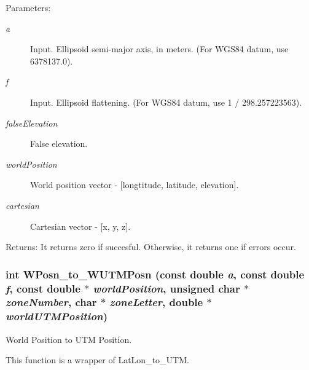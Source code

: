 \begin{Desc}
\item[Parameters:]
\begin{description}
\item[{\em a}]Input. Ellipsoid semi-major axis, in meters. (For WGS84 datum, use 6378137.0). \item[{\em f}]Input. Ellipsoid flattening. (For WGS84 datum, use 1 / 298.257223563). \item[{\em falseElevation}]False elevation. \item[{\em worldPosition}]World position vector - \mbox{[}longtitude, latitude, elevation\mbox{]}. \item[{\em cartesian}]Cartesian vector - \mbox{[}x, y, z\mbox{]}.\end{description}
\end{Desc}
\begin{Desc}
\item[Returns:]It returns zero if succesful. Otherwise, it returns one if errors occur. \end{Desc}
\hypertarget{group__Coordinate_g243a9a9ac70866ba4d4513d353058e92}{
\subsubsection[WPosn\_\-to\_\-WUTMPosn]{\setlength{\rightskip}{0pt plus 5cm}int WPosn\_\-to\_\-WUTMPosn (const double {\em a}, \/  const double {\em f}, \/  const double $\ast$ {\em worldPosition}, \/  unsigned char $\ast$ {\em zoneNumber}, \/  char $\ast$ {\em zoneLetter}, \/  double $\ast$ {\em worldUTMPosition})}}
\label{group__Coordinate_g243a9a9ac70866ba4d4513d353058e92}


World Position to UTM Position. 

This function is a wrapper of LatLon\_\-to\_\-UTM.

